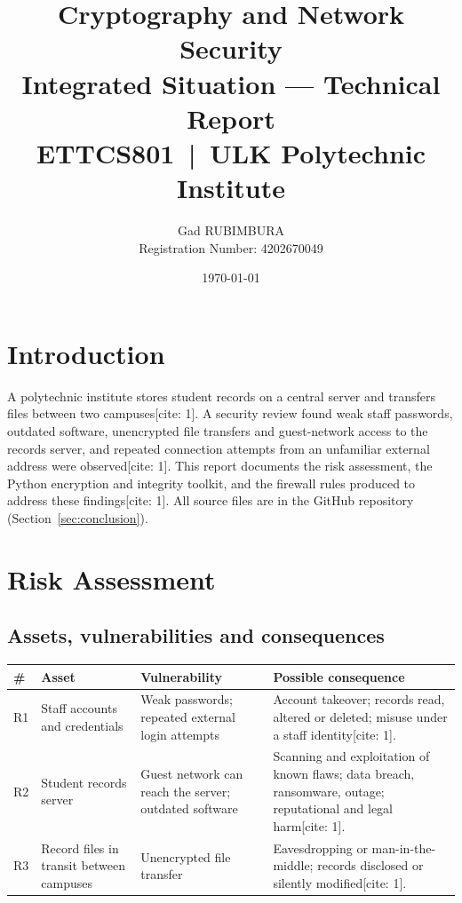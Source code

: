 \documentclass[11pt,a4paper]{article}
\title{Cryptography and Network Security\\ \large Integrated Situation --- Technical Report\\
        \normalsize ETTCS801 \,|\, ULK Polytechnic Institute}
\author{Gad RUBIMBURA \\ Registration Number: 4202670049}
\date{\today}
\begin{document}
\maketitle
\tableofcontents
\bigskip

\section{Introduction}
A polytechnic institute stores student records on a central server and transfers files between two campuses[cite: 1].
A security review found weak staff passwords, outdated software, unencrypted file transfers and guest-network
access to the records server, and repeated connection attempts from an unfamiliar external address were observed[cite: 1].
This report documents the risk assessment, the Python encryption and integrity toolkit, and the firewall
rules produced to address these findings[cite: 1]. All source files are in the GitHub repository (Section~\ref{sec:conclusion}).

\section{Risk Assessment}
\subsection{Assets, vulnerabilities and consequences}
\begin{longtable}{@{}p{0.3cm}p{3.3cm}p{4.2cm}p{6.3cm}@{}}
\toprule
\# & Asset & Vulnerability & Possible consequence\\ \midrule\endhead
R1 & Staff accounts and credentials & Weak passwords; repeated external login attempts &
Account takeover; records read, altered or deleted; misuse under a staff identity[cite: 1].\\[4pt]
R2 & Student records server & Guest network can reach the server; outdated software &
Scanning and exploitation of known flaws; data breach, ransomware, outage; reputational and legal harm[cite: 1].\\[4pt]
R3 & Record files in transit between campuses & Unencrypted file transfer &
Eavesdropping or man-in-the-middle; records disclosed or silently modified[cite: 1].\\
\bottomrule
\end{longtable}
\end{document}
